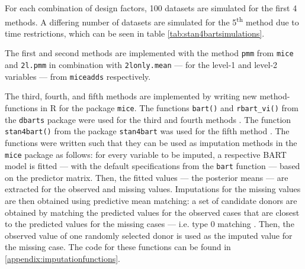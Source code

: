 \documentclass[3p,12pt,a4paper]{elsarticle}
\begin{document}
For each combination of design factors, 100 datasets are simulated for the first 4 methods. A differing number of datasets are simulated for the 5\textsuperscript{th} method due to time restrictions, which can be seen in table \ref{tab:stan4bartsimulations}.
  
The first and second methods are implemented with the method \texttt{pmm} from \texttt{mice} and \texttt{2l.pmm} in combination with \texttt{2lonly.mean} --- for the level-1 and level-2 variables --- from \texttt{miceadds} \citep{robitzsch2024} respectively.

The third, fourth, and fifth methods are implemented by writing new method-functions in R for the package \texttt{mice}. The functions \texttt{bart()} and \texttt{rbart\_vi()} from the \texttt{dbarts} package were used for the third and fourth methods \citep{dorie2024}. The function \texttt{stan4bart()} from the package \texttt{stan4bart} was used for the fifth method \citep{dorie2023a}. The functions were written such that they can be used as imputation methods in the \texttt{mice} package as follows: for every variable to be imputed, a respective BART model is fitted --- with the default specifications from the \texttt{bart} function --- based on the predictor matrix. Then, the fitted values --- the posterior means --- are extracted for the observed and missing values. Imputations for the missing values are then obtained using predictive mean matching: a set of candidate donors are obtained by matching the predicted values for the observed cases that are closest to the predicted values for the missing cases --- i.e. type 0 matching \citep{buurenFlexibleImputationMissing2018}. Then, the observed value of one randomly selected donor is used as the imputed value for the missing case. The code for these functions can be found in \ref{appendix:imputationfunctions}.

\begin{table}
    \centering
    \caption{Number of simulated datasets used in evaluation of the stan4bart imputation method for every design factor.}
    \label{tab:stan4bartsimulations}
    \end{table}
\end{document}
